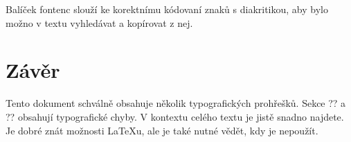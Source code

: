 \documentclass[czech,a4paper,10pt,twocolumn]{article}
\begin{document}
Balíček fontenc slouží ke korektnímu kódovaní znaků s diakritikou, aby bylo možno v textu vyhledávat a kopírovat z nej.

\section{Závěr}

Tento dokument schválně obsahuje několik typografických prohřešků. Sekce ?? a ?? obsahují typografické chyby. V kontextu celého textu je jistě snadno najdete. Je dobré znát možnosti LaTeXu, ale je také nutné vědět, kdy je nepoužít.
\end{document}
